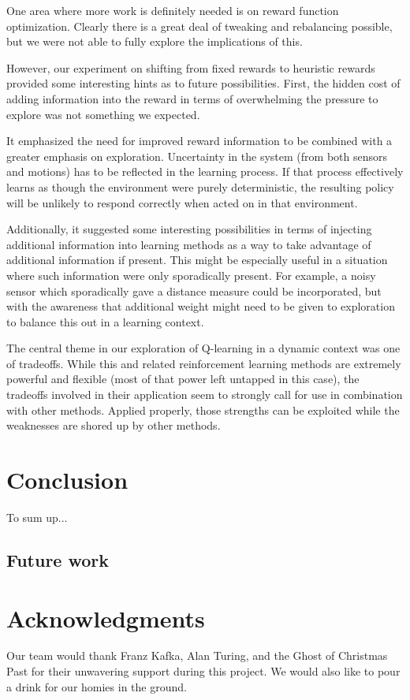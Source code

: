 \documentclass{aiaa-tc}%
\begin{document}
One area where more work is definitely needed is on reward function
optimization. Clearly there is a great deal of tweaking and rebalancing
possible, but we were not able to fully explore the implications of
this.

However, our experiment on shifting from fixed rewards to
heuristic rewards provided some interesting hints as to future possibilities. First, the hidden cost of
adding information into the reward in terms of overwhelming the
pressure to explore was not something we expected. 

It
emphasized the need for improved reward information to be combined with a greater emphasis
on exploration. Uncertainty in the system (from both sensors and
motions) has to be reflected in the learning process. If that process
effectively learns as though the environment were purely
deterministic, the resulting policy will be unlikely to respond
correctly when acted on in that environment.

Additionally, it
suggested some interesting possibilities in terms of injecting
additional information into learning methods as a way to take
advantage of additional information if present. This might be
especially useful in a situation where such information were only
sporadically present. For example, a noisy sensor which sporadically
gave a distance measure could be incorporated, but with the awareness
that additional weight might need to be given to exploration to
balance this out in a learning context.

The central theme in our exploration of Q-learning in a dynamic
context was one of tradeoffs. While this and related reinforcement
learning methods are extremely powerful and flexible (most of that power
left untapped in this case), the tradeoffs involved in their application
seem to strongly call for use in combination with other
methods. Applied properly, those strengths can be exploited while the weaknesses
are shored up by other methods.

\section{Conclusion}
\label{Conclusion}
To sum up...

\subsection{Future work}

\section{Acknowledgments}
Our team would thank Franz Kafka, Alan Turing, and the Ghost of
Christmas Past for their unwavering support during this project. We
would also like to pour a drink for our homies in the ground.


% 

% 
\end{document}
